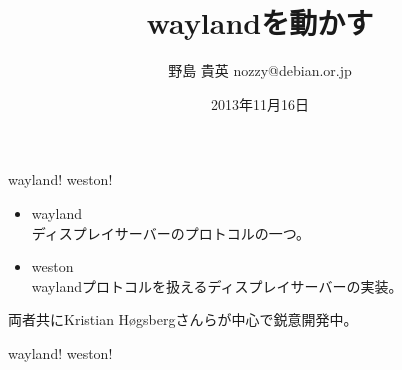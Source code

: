\title{waylandを動かす}
\author{野島 貴英 nozzy@debian.or.jp}
\date{2013年11月16日}



\frame{\titlepage{}}


\begin{frame}{wayland! weston!}
\begin{itemize}
\item wayland\\
ディスプレイサーバーのプロトコルの一つ。
\item weston\\
 waylandプロトコルを扱えるディスプレイサーバーの実装。
\end{itemize}

 両者共にKristian H\o{}gsbergさんらが中心で鋭意開発中。

\end{frame}

\begin{frame}{wayland! weston!}
\end{frame}

